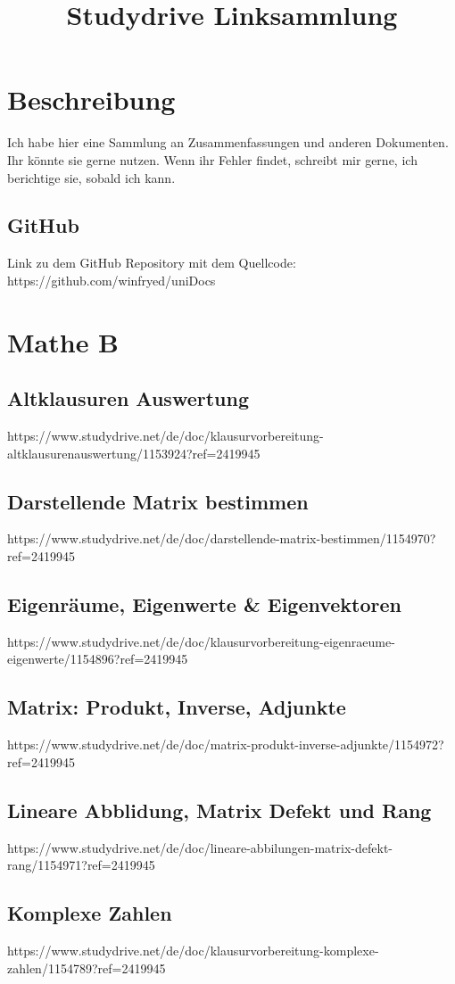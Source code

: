 \documentclass[11pt]{article}
\begin{document}
    \title{Studydrive Linksammlung}
    \section{Beschreibung}
    Ich habe hier eine Sammlung an Zusammenfassungen und anderen Dokumenten.
    Ihr könnte sie gerne nutzen.
    Wenn ihr Fehler findet, schreibt mir gerne, ich berichtige sie, sobald ich kann.
    \subsection{GitHub}
    Link zu dem GitHub Repository mit dem Quellcode: https://github.com/winfryed/uniDocs

    \section{Mathe B}
    \subsection{Altklausuren Auswertung}
    https://www.studydrive.net/de/doc/klausurvorbereitung-altklausurenauswertung/1153924?ref=2419945
    \subsection{Darstellende Matrix bestimmen}
    https://www.studydrive.net/de/doc/darstellende-matrix-bestimmen/1154970?ref=2419945
    \subsection{Eigenräume, Eigenwerte & Eigenvektoren}
    https://www.studydrive.net/de/doc/klausurvorbereitung-eigenraeume-eigenwerte/1154896?ref=2419945
    \subsection{Matrix: Produkt, Inverse, Adjunkte}
    https://www.studydrive.net/de/doc/matrix-produkt-inverse-adjunkte/1154972?ref=2419945
    \subsection{Lineare Abblidung, Matrix Defekt und Rang}
    https://www.studydrive.net/de/doc/lineare-abbilungen-matrix-defekt-rang/1154971?ref=2419945
    \subsection{Komplexe Zahlen}
    https://www.studydrive.net/de/doc/klausurvorbereitung-komplexe-zahlen/1154789?ref=2419945
\end{document}
